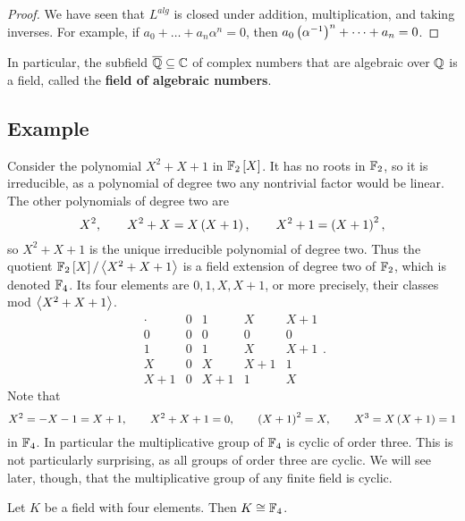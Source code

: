\begin{proof}
We have seen that $ L^{alg} $ is closed under addition, multiplication, and taking inverses. For example, if $ a_0 + \dots + a_n\alpha^n = 0 $, then $ a_0\br{\alpha^{-1}}^n + \dots + a_n = 0 $.
\end{proof}

\begin{example*}
In particular, the subfield $ \overline{\mathbb{Q}} \subseteq \mathbb{C} $ of complex numbers that are algebraic over $ \mathbb{Q} $ is a field, called the \textbf{field of algebraic numbers}.
\end{example*}

\subsection{Example}

\begin{example*}
Consider the polynomial $ X^2 + X + 1 $ in $ \F_2\sbr{X} $. It has no roots in $ \mathbb{F}_2 $, so it is irreducible, as a polynomial of degree two any nontrivial factor would be linear. The other polynomials of degree two are
$$ X^2, \qquad X^2 + X = X\br{X + 1}, \qquad X^2 + 1 = \br{X + 1}^2, $$
so $ X^2 + X + 1 $ is the unique irreducible polynomial of degree two. Thus the quotient $ \F_2\sbr{X} / \abr{X^2 + X + 1} $ is a field extension of degree two of $ \mathbb{F}_2 $, which is denoted $ \mathbb{F}_4 $. Its four elements are $ 0, 1, X, X + 1 $, or more precisely, their classes mod $ \left\langle X^2 + X + 1 \right\rangle $.
$$
\begin{array}{c|cccc}
\cdot & 0 & 1 & X & X + 1 \\
\hline
0 & 0 & 0 & 0 & 0 \\
1 & 0 & 1 & X & X + 1 \\
X & 0 & X & X + 1 & 1 \\
X + 1 & 0 & X + 1 & 1 & X
\end{array}.
$$
Note that
$$ X^2 = -X - 1 = X + 1, \qquad X^2 + X + 1 = 0, \qquad \br{X + 1}^2 = X, \qquad X^3 = X\br{X + 1} = 1 $$
in $ \mathbb{F}_4 $. In particular the multiplicative group of $ \mathbb{F}_4 $ is cyclic of order three. This is not particularly surprising, as all groups of order three are cyclic. We will see later, though, that the multiplicative group of any finite field is cyclic.
\end{example*}

\begin{proposition}
Let $ K $ be a field with four elements. Then $ K \cong \mathbb{F}_4 $.
\end{proposition}

